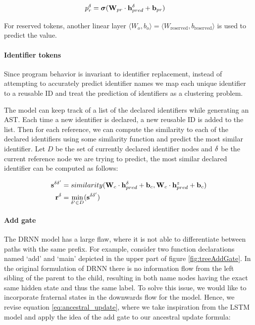 \begin{align}
    p_r^\delta &= \boldsymbol\sigma(\mathbf{W}_{pr} \cdot \mathbf{h}_{pred}^\delta + \mathbf{b}_{pr}) \label{eq:res_pred}
\end{align}

For reserved tokens, another linear layer $\langle W_o,b_o \rangle = \langle W_\text{reserved},b_\text{reserved} \rangle$ is used to predict the value.

\paragraph{Identifier tokens}
Since program behavior is invariant to identifier replacement, instead of attempting to accurately predict identifier names we map each unique identifier to a reusable ID \cite{tufanoLearningMeaningfulCode2019} and treat the prediction of identifiers as a clustering problem. 

The model can keep track of a list of the declared identifiers while generating an AST. Each time a new identifier is declared, a new reusable ID is added to the list. Then for each reference, we can compute the similarity to each of the declared identifiers using some similarity function and predict the most similar identifier. Let $D$ be the set of currently declared identifier nodes and $\delta$ be the current reference node we are trying to predict, the most similar declared identifier can be computed as follows:

\begin{align}
    \mathbf{s}^{\delta \delta'} &= similarity(\mathbf{W}_c \cdot \mathbf{h}^\delta_{pred} + \mathbf{b}_c,  \mathbf{W}_c \cdot \mathbf{h}^z_{pred} + \mathbf{b}_c) \\
    \mathbf{r}^\delta &= \min_{\delta' \in D}(\mathbf{s}^{\delta \delta'})
\end{align}

\paragraph{Add gate} \label{par:addgate} The DRNN model has a large flaw, where it is not able to differentiate between paths with the same prefix. For example, consider two function declarations named `add' and `main' depicted in the upper part of figure \ref{fig:treeAddGate}. In the original formulation of DRNN \cite{alvarez-melisTreestructuredDecodingDoublyrecurrent2017} there is no information flow from the left sibling of the parent to the child, resulting in both name nodes having the exact same hidden state and thus the same label. To solve this issue, we would like to incorporate fraternal states in the downwards flow for the model. Hence, we revise equation \ref{eq:ancestral_update}, where we take inspiration from the LSTM model and apply the idea of the add gate to our ancestral update formula:

